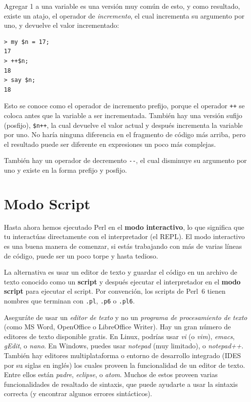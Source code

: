 Agregar 1 a una variable es una versión muy común de esto, 
y como resultado, existe un atajo, el operador de \emph{incremento},
el cual incrementa su argumento por uno, y devuelve el valor incrementado: 

\begin{lstlisting}
> my $n = 17;
17
> ++$n;
18
> say $n;
18
\end{lstlisting}
%
Esto se conoce como el operador de incremento prefijo, porque el operador \verb|++|
se coloca antes que la variable a ser incrementada. También hay una versión sufijo (posfijo),
\verb|$n++|, la cual devuelve el valor actual y después incrementa la variable por uno. 
No haría ninguna diferencia en el fragmento de código más arriba, pero el resultado puede
ser diferente en expresiones un poco más complejas.

También hay un operador de decremento \verb|--|, el cual disminuye 
su argumento por uno y existe en la forma prefijo y posfijo. 



\section{Modo Script}

Hasta ahora hemos ejecutado Perl  en el {\bf modo interactivo}, lo que 
significa que tu interactúas directamente con el interpretador (el REPL).
El modo interactivo es una buena manera de comenzar, si estás trabajando 
con más de varias líneas de código, puede ser un poco torpe y hasta tedioso.

La alternativa es usar un editor de texto y guardar el código en un archivo de 
texto conocido como un {\bf script} y después ejecutar el interpretador en el 
{\bf modo script} para ejecutar el script. Por convención, los scripts de Perl~6 
tienen nombres que terminan con {\tt .pl}, {\tt .p6} o {\tt .pl6}.

Aseguráte de usar un \emph{editor de texto} y no un \emph{programa de procesamiento de texto}
(como MS Word, OpenOffice o LibreOffice Writer). Hay un gran número de editores
de texto disponible gratis. En Linux, podrías usar \emph{vi} (o \emph{vim}), 
\emph{emacs}, \emph{gEdit}, o \emph{nano}. En Windows, puedes usar \emph{notepad} (muy limitado),
o \emph{notepad++}. También hay editores multiplataforma o entorno de desarrollo integrado
(IDES por su siglas en inglés) los cuales proveen la funcionalidad de un editor de texto. 
Entre ellos están \emph{padre}, \emph{eclipse}, o \emph{atom}. Muchos de estos proveen 
varias funcionalidades de resaltado de sintaxis, que puede ayudarte a usar 
la sintaxis correcta (y encontrar algunos errores sintácticos).

